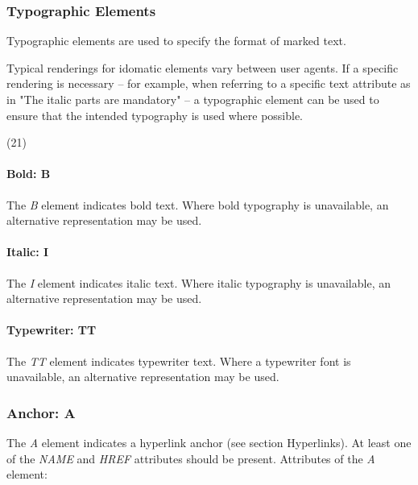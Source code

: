 \subsubsection*{Typographic Elements}\par 
Typographic elements are used to specify the format of marked text.
\par \par 
Typical renderings for idomatic elements vary between user
agents.  If a specific rendering is necessary -- for example, when
referring to a specific text attribute as in "The italic parts are
mandatory" -- a typographic element can be used to ensure that the
intended typography is used where possible.
\par \par (21)\par \paragraph*{Bold:  B}\par 
The {\it B} element indicates bold text.  Where bold typography is
unavailable, an alternative representation may be used.
\par \paragraph*{Italic:  I}\par 
The {\it I} element indicates italic text.  Where italic typography
is unavailable, an alternative representation may be used.
\par \paragraph*{Typewriter:  TT}\par 
The {\it TT} element indicates typewriter text.  Where a typewriter
font is unavailable, an alternative representation may be used.
\par \subsubsection*{Anchor:  A}\par 
The {\it A} element indicates a hyperlink anchor (see section Hyperlinks).  At least one of the {\it NAME} and {\it HREF}
attributes should be present.  Attributes of the {\it A} element:
